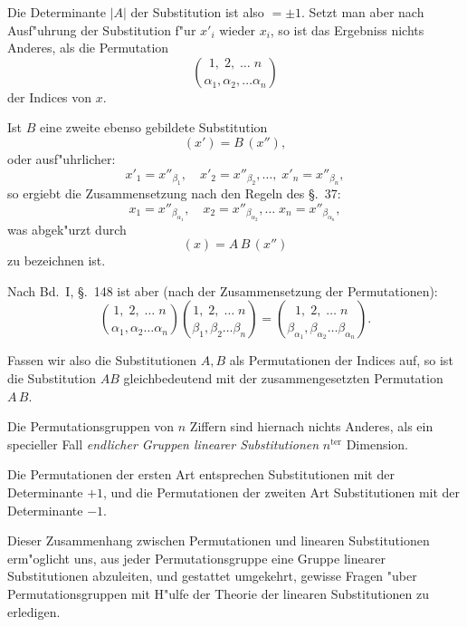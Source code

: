 \documentclass[12pt,a4paper]{article}
\theoremstyle{weber}
\begin{document}
Die Determinante $|A|$ der Substitution ist also $= \pm 1$. Setzt man aber nach Ausf"uhrung der Substitution f"ur $x'_i$ wieder $x_i$, so ist das Ergebniss nichts Anderes, als die Permutation
\[
\binom{1,\; 2,\; \ldots\; n}{\alpha_1, \alpha_2, \ldots \alpha_n}
\]
der Indices von $x$.

Ist $B$ eine zweite ebenso gebildete Substitution
\begin{equation}\label{eq:3}
(x') = B\,(x''),
\end{equation}
oder ausf"uhrlicher:
\begin{equation}\label{eq:4}
x'_1 = x''_{\beta_1},\quad x'_2 = x''_{\beta_2}, \ldots,\; x'_n = x''_{\beta_n},
\end{equation}
so ergiebt die Zusammensetzung nach den Regeln des \S.~37:
\begin{equation}\label{eq:5}
x_1 = x''_{\beta_{\alpha_1}},\quad x_2 = x''_{\beta_{\alpha_2}}, \ldots\; x_n = x''_{\beta_{\alpha_n}},
\end{equation}
was abgek"urzt durch
\begin{equation}\label{eq:6}
(x) = A\,B\,(x'')
\end{equation}
zu bezeichnen ist.

Nach Bd.~I, \S.~148 ist aber (nach der Zusammensetzung der Permutationen):
\begin{equation}\label{eq:7}
\binom{1,\; 2,\; \ldots\; n}{\alpha_1, \alpha_2 \ldots \alpha_n}
\binom{1,\; 2,\; \ldots\; n}{\beta_1, \beta_2 \ldots \beta_n}
=
\binom{1,\; 2,\; \ldots\; n}{\beta_{\alpha_1}, \beta_{\alpha_2} \ldots \beta_{\alpha_n}}.
\end{equation}

Fassen wir also die Substitutionen $A, B$ als Permutationen der Indices auf, so ist die Substitution $AB$ gleichbedeutend mit der zusammengesetzten Permutation $A\,B$.

Die Permutationsgruppen von $n$ Ziffern sind hiernach nichts Anderes, als ein specieller Fall \textit{endlicher Gruppen linearer Substitutionen} $n^{\text{ter}}$ Dimension.

Die Permutationen der ersten Art entsprechen Substitutionen mit der Determinante $+1$, und die Permutationen der zweiten Art Substitutionen mit der Determinante $-1$.


Dieser Zusammenhang zwischen Permutationen und linearen Substitutionen erm"oglicht uns, aus jeder Permutationsgruppe eine Gruppe linearer Substitutionen abzuleiten, und gestattet umgekehrt, gewisse Fragen "uber Permutationsgruppen mit H"ulfe der Theorie der linearen Substitutionen zu erledigen.
\end{document}
